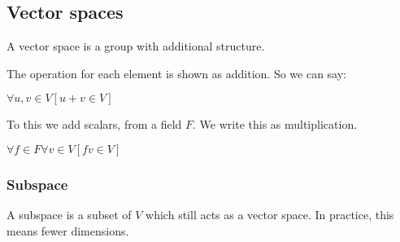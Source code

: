 
\subsection{Vector spaces}

A vector space is a group with additional structure.

The operation for each element is shown as addition. So we can say:

\(\forall u,v \in V [u+v \in V]\)

To this we add scalars, from a field \(F\). We write this as multiplication.

\(\forall f \in F \forall v \in V [fv \in V]\)

\subsubsection{Subspace}

A subspace is a subset of \(V\) which still acts as a vector space. In practice, this means fewer dimensions.

